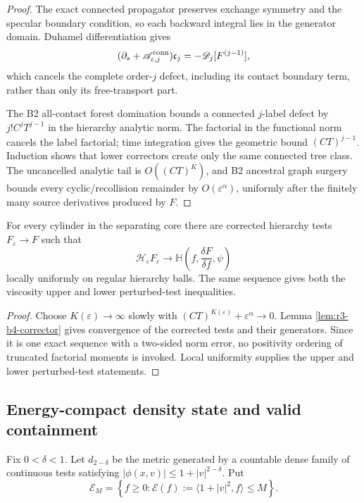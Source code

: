 \begin{proof}
The exact connected propagator preserves exchange symmetry and the specular
boundary condition, so each backward integral lies in the generator domain.
Duhamel differentiation gives
\[
 (\partial_s+\mathscr A_{\varepsilon,j}^{\rm conn})
 \mathfrak c_j=-\mathscr D_j[F^{(j-1)}],
\]
which cancels the complete order-\(j\) defect, including its contact boundary
term, rather than only its free-transport part.

The B2 all-contact forest domination bounds a connected \(j\)-label defect by
\(j!C^jT^{j-1}\) in the hierarchy analytic norm.  The factorial in the
functional norm cancels the label factorial; time integration gives the
geometric bound \((CT)^{j-1}\).  Induction shows that lower correctors create
only the same connected tree class.  The uncancelled analytic tail is
\(O((CT)^K)\), and B2 ancestral graph surgery bounds every cyclic/recollision
remainder by \(O(\varepsilon^\alpha)\), uniformly after the finitely many
source derivatives produced by \(F\).
\end{proof}

\begin{theorem}
\label{thm:r3-b4-generator}
For every cylinder in the separating core there are corrected hierarchy tests
\(F_\varepsilon\to F\) such that
\[
 \mathscr H_\varepsilon F_\varepsilon
 \longrightarrow
 \mathbb H\left(f,\frac{\delta F}{\delta f},\psi\right)
\]
locally uniformly on regular hierarchy balls.  The same sequence gives both
the viscosity upper and lower perturbed-test inequalities.
\end{theorem}

\begin{proof}
Choose \(K(\varepsilon)\to\infty\) slowly with
\((CT)^{K(\varepsilon)}+\varepsilon^\alpha\to0\).  Lemma
\ref{lem:r3-b4-corrector} gives convergence of the corrected tests and their
generators.  Since it is one exact sequence with a two-sided norm error, no
positivity ordering of truncated factorial moments is invoked.  Local
uniformity supplies the upper and lower perturbed-test statements.
\end{proof}

\subsection{Energy-compact density state and valid containment}

Fix \(0<\delta<1\).  Let \(d_{2-\delta}\) be the metric generated by a
countable dense family of continuous tests satisfying
\(|\phi(x,v)|\le1+|v|^{2-\delta}\).  Put
\[
 \mathcal E_M=
 \left\{f\ge0:\mathcal E(f):=
 \langle1+|v|^2,f\rangle\le M\right\}.
\]

